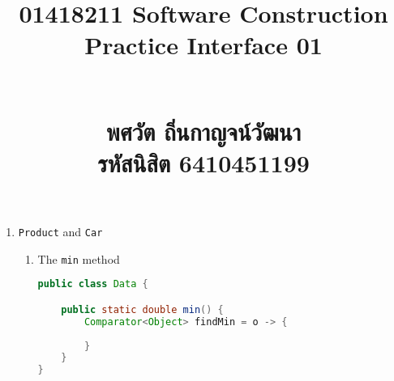 \documentclass{article}
\title{\flushleft\Large 01418211 Software Construction\\
\Huge\textbf{Practice Interface 01}\\
\rule{0em}{1ex}\\
\normalsize พศวัต ถิ่นกาญจน์วัฒนา\\
รหัสนิสิต 6410451199
\vspace{-8ex}}
\author{}
\date{}
\begin{document}
\maketitle
\sloppy\flushleft
\begin{enumerate}
    \item \texttt{Product} and \texttt{Car}
        \begin{enumerate}
        \item The \texttt{min} method
        \begin{lstlisting}[language=Java,numbers=none,frame=none,title={Data.java}]
public class Data {

    public static double min() {
        Comparator<Object> findMin = o -> {
            
        }
    }
}
        \end{lstlisting}
    \end{enumerate}
\end{enumerate}
\end{document}
